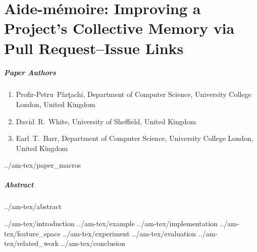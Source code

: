 \chapter{Aide-mémoire: Improving a Project’s Collective Memory via Pull Request--Issue Links}
\label{chapter:am}

\paragraph{Paper Authors}
\begin{enumerate}
    \item[]  Profir-Petru~P\^ar\c{t}achi, Department of Computer Science, University College London, United Kingdom
    \item[] David~R.~White, University of Sheffield, United Kingdom
    \item[] Earl~T.~Barr, Department of Computer Science, University College London, United Kingdom
\end{enumerate}

{../am-tex/paper_macros}

\paragraph{Abstract}
{../am-tex/abstract}

{../am-tex/introduction}
{../am-tex/example}
{../am-tex/implementation}
{../am-tex/feature_space}
{../am-tex/experiment}
{../am-tex/evaluation}
{../am-tex/related_work}
{../am-tex/conclusion}
